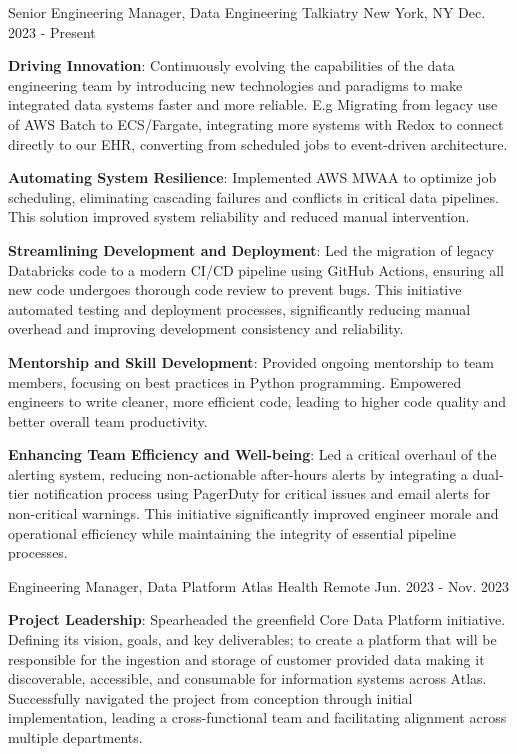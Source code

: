 \begin{cventries}
  \cventry
    {Senior Engineering Manager, Data Engineering}
    {Talkiatry}
    {New York, NY}
    {Dec. 2023 - Present}
    {
      \begin{cvitems}
          \item {\textbf{Driving Innovation}: Continuously evolving the capabilities of the data engineering team by introducing new technologies and paradigms to make integrated data systems faster and more reliable. E.g Migrating from legacy use of AWS Batch to ECS/Fargate, integrating more systems with Redox to connect directly to our EHR, converting from scheduled jobs to event-driven architecture.}
          \item {\textbf{Automating System Resilience}: Implemented AWS MWAA to optimize job scheduling, eliminating cascading failures and conflicts in critical data pipelines. This solution improved system reliability and reduced manual intervention.}
          \item {\textbf{Streamlining Development and Deployment}: Led the migration of legacy Databricks code to a modern CI/CD pipeline using GitHub Actions, ensuring all new code undergoes thorough code review to prevent bugs. This initiative automated testing and deployment processes, significantly reducing manual overhead and improving development consistency and reliability.}
          \item {\textbf{Mentorship and Skill Development}: Provided ongoing mentorship to team members, focusing on best practices in Python programming. Empowered engineers to write cleaner, more efficient code, leading to higher code quality and better overall team productivity.}
          \item {\textbf{Enhancing Team Efficiency and Well-being}: Led a critical overhaul of the alerting system, reducing non-actionable after-hours alerts by integrating a dual-tier notification process using PagerDuty for critical issues and email alerts for non-critical warnings. This initiative significantly improved engineer morale and operational efficiency while maintaining the integrity of essential pipeline processes.}
      \end{cvitems}
    }
  \cventry
    {Engineering Manager, Data Platform}
    {Atlas Health}
    {Remote}
    {Jun. 2023 - Nov. 2023}
    {
      \begin{cvitems}
          \item {\textbf{Project Leadership}: Spearheaded the greenfield Core Data Platform initiative. Defining its vision, goals, and key deliverables; to create a platform that will be responsible for the ingestion and storage of customer provided data making it discoverable, accessible, and consumable for information systems across Atlas. Successfully navigated the project from conception through initial implementation, leading a cross-functional team and facilitating alignment across multiple departments.}

\end{cvitems}}
\end{cventries}
